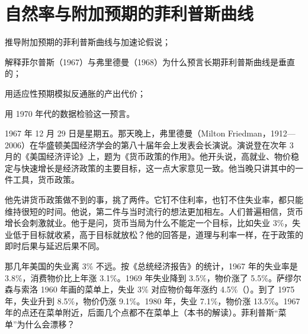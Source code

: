 \chapter{自然率与附加预期的菲利普斯曲线}\label{ch:naturalrate}

\begin{chapterguide}
\begin{guidegoals}
\item 推导附加预期的菲利普斯曲线与加速论假说；
\item 解释菲尔普斯（1967）与弗里德曼（1968）为什么预言长期菲利普斯曲线是垂直的；
\item 用适应性预期模拟反通胀的产出代价；
\item 用 1970 年代的数据检验这一预言。
\end{guidegoals}
\end{chapterguide}

1967 年 12 月 29 日是星期五。那天晚上，弗里德曼（Milton Friedman，1912—2006）在华盛顿美国经济学会的第八十届年会上发表会长演说\cite{friedman1968,loc44}。演说登在次年 3 月的《美国经济评论》上，题为《货币政策的作用》\cite{friedman1968}。他开头说，高就业、物价稳定与快速增长是经济政策的主要目标，这一点大家意见一致\cite{friedman1968}。他当晚只讲其中的一件工具，货币政策\cite{friedman1968}。

他先讲货币政策做不到的事，挑了两件。它钉不住利率，也钉不住失业率，都只能维持很短的时间\cite{friedman1968}。他说，第二件与当时流行的想法更加相左\cite{friedman1968}。人们普遍相信，货币增长会刺激就业。他于是问，货币当局为什么不能定一个目标，比如失业 3\%，失业低于目标就收紧，高于目标就放松\cite{friedman1968}？他的回答是，道理与利率一样，在于政策的即时后果与延迟后果不同\cite{friedman1968}。

那几年美国的失业离 3\% 不远。按《总统经济报告》的统计，1967 年的失业率是 3.8\%，消费物价比上年涨 3.1\%\cite{erp2000}。1969 年失业降到 3.5\%，物价涨了 5.5\%\cite{erp2000}。萨缪尔森与索洛 1960 年画的菜单上，失业 3\% 对应物价每年涨约 4.5\%（）。到了 1975 年，失业升到 8.5\%，物价仍涨 9.1\%\cite{erp2000}。1980 年，失业 7.1\%，物价涨 13.5\%\cite{erp2000}。1967 年的点还在菜单附近，后面几个点都不在菜单上（本书的解读）。菲利普斯“菜单”为什么会漂移？

